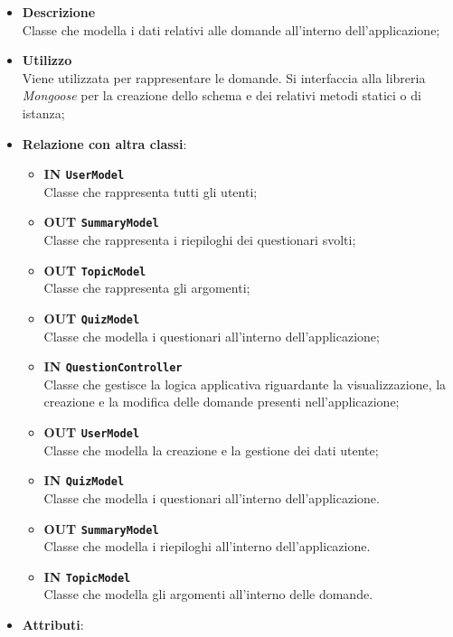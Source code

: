 	\begin{itemize}
		\item \textbf{Descrizione} \\
		Classe che modella i dati relativi alle domande all'interno dell'applicazione;	
		\item \textbf{Utilizzo} \\
		Viene utilizzata per rappresentare le domande. Si interfaccia alla libreria \textit{Mongoose} per la creazione dello schema e dei relativi metodi statici o di istanza;
		\item \textbf{Relazione con altra classi}:
			\begin{itemize}
			\item \textbf{IN \texttt{UserModel}} \\
			Classe che rappresenta tutti gli utenti;
			\item \textbf{OUT \texttt{SummaryModel} }\\
			Classe che rappresenta i riepiloghi dei questionari svolti;
			\item \textbf{OUT \texttt{TopicModel}} \\
			Classe che rappresenta gli argomenti;
			\item \textbf{OUT \texttt{QuizModel}} \\
			Classe che modella i questionari all'interno dell'applicazione;
			\item \textbf{IN \texttt{QuestionController}} \\
			Classe che gestisce la logica applicativa riguardante la visualizzazione, la creazione e la modifica delle domande presenti nell'applicazione;
			\item \textbf{OUT \texttt{UserModel}} \\
			Classe che modella la creazione e la gestione dei dati utente;
			\item \textbf{IN \texttt{QuizModel}} \\
			Classe che modella i questionari all'interno dell'applicazione.
			\item \textbf{OUT \texttt{SummaryModel}} \\
			Classe che modella i riepiloghi all'interno dell'applicazione.
			\item \textbf{IN \texttt{TopicModel}} \\
			Classe che modella gli argomenti all'interno delle domande.
			\end{itemize}
		\item \textbf{Attributi}:
	\begin{itemize}

\end{itemize}
\end{itemize}
